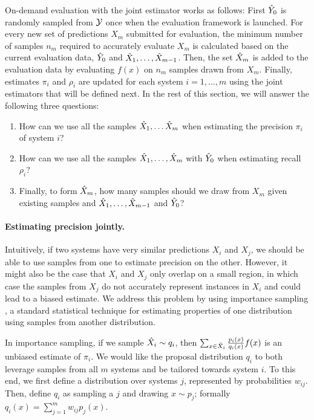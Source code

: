 On-demand evaluation with the joint estimator works as follows:
First ${\hat{Y}}_0$ is randomly sampled from $\mathcal{Y}$ once when the evaluation framework is launched.
For every new set of predictions $X_m$ submitted for evaluation, the minimum number of samples $n_m$ required to accurately evaluate $X_m$ is calculated based on the current evaluation data, ${\hat{Y}}_0$ and ${\hat{X}}_1, \ldots, {\hat{X}}_{m-1}$.
Then, the set ${\hat{X}}_m$ is added to the evaluation data by evaluating $f(x)$ on $n_m$ samples drawn from $X_m$.
Finally, estimates $\pi_i$ and $\rho_i$ are updated for each system $i = 1,\ldots,m$ using the joint estimators that will be defined next.
In the rest of this section, we will answer the following three questions:
\begin{enumerate}
  \item How can we use all the samples ${\hat{X}}_1, \ldots {\hat{X}}_m$ when estimating the precision $\pi_i$ of system $i$?
  \item How can we use all the samples ${\hat{X}}_1, \ldots, {\hat{X}}_m$ with ${\hat{Y}}_0$ when estimating recall $\rho_i$?
  \item Finally, to form ${\hat{X}}_m$, how many samples should we draw from $X_m$ given existing samples and ${\hat{X}}_1, \ldots, {\hat{X}}_{m-1}$ and ${\hat{Y}}_0$?
\end{enumerate}

\paragraph{Estimating precision jointly.}
Intuitively, if two systems have very similar predictions $X_i$ and $X_j$, we should be able to use samples from one to estimate precision on the other.
However, it might also be the case that $X_i$ and $X_j$ only overlap on a small region, in which case the samples from $X_j$ do not accurately represent instances in $X_i$ and could lead to a biased estimate.
We address this problem by using importance sampling \citep{owen2013monte}, a standard statistical technique for estimating properties of one distribution using samples from another distribution.

In importance sampling, if we sample ${\hat{X}}_i \sim q_i$, then $\sum_{x \in {\hat{X}}_i} \frac{p_i(x)}{q_i(x)} f(x)$ is an unbiased estimate of $\pi_i$.
We would like the proposal distribution $q_i$ to both leverage samples from all $m$ systems and be tailored towards system $i$.
To this end, we first define a distribution over systems $j$, represented by probabilities $w_{ij}$.
Then, define $q_i$ as sampling a $j$ and drawing $x \sim p_j$;
formally $q_i(x) = \sum_{j=1}^m w_{ij} p_j(x)$.

